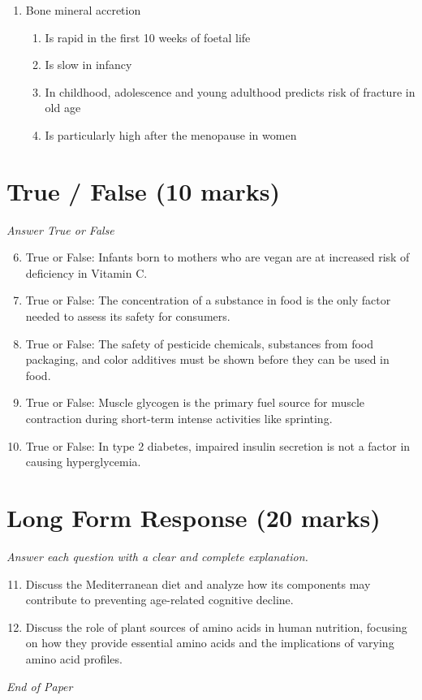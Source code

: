 \documentclass[12pt]{article}
\begin{document}
\begin{enumerate}[label=\arabic*.]
\begin{enumerate}[label=(\alph*)]
    \item Particular care must be taken during breast feeding in high risk infants
    \item Living on a working farm will increase the development of atopic diseases
\end{enumerate}
\item Bone mineral accretion
\begin{enumerate}[label=(\alph*)]
    \item Is rapid in the first 10 weeks of foetal life
    \item Is slow in infancy
    \item In childhood, adolescence and young adulthood predicts risk of fracture in old age
    \item Is particularly high after the menopause in women
\end{enumerate}
\end{enumerate}

\section*{True / False (10 marks)}
\textit{Answer True or False}
\begin{enumerate}[label=\arabic*.]
\setcounter{enumi}{5}
\item True or False: Infants born to mothers who are vegan are at increased risk of deficiency in Vitamin C.
\item True or False: The concentration of a substance in food is the only factor needed to assess its safety for consumers.
\item True or False: The safety of pesticide chemicals, substances from food packaging, and color additives must be shown before they can be used in food.
\item True or False: Muscle glycogen is the primary fuel source for muscle contraction during short-term intense activities like sprinting.
\item True or False: In type 2 diabetes, impaired insulin secretion is not a factor in causing hyperglycemia.
\end{enumerate}

\section*{Long Form Response (20 marks)}
\textit{Answer each question with a clear and complete explanation.}
\begin{enumerate}[label=\arabic*.]
\setcounter{enumi}{10}
\item Discuss the Mediterranean diet and analyze how its components may contribute to preventing age-related cognitive decline.
\item Discuss the role of plant sources of amino acids in human nutrition, focusing on how they provide essential amino acids and the implications of varying amino acid profiles.
\end{enumerate}

\vfill
\noindent\textit{End of Paper}
\end{document}
